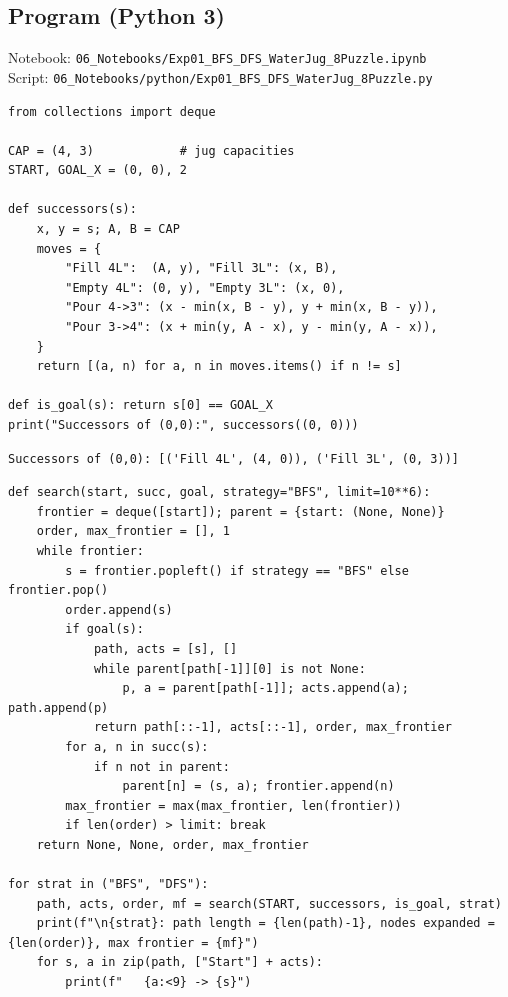 \documentclass[11pt]{article}
\begin{document}
\subsection*{Program (Python 3)}
{\small\color{slate}Notebook: \texttt{06\_Notebooks/Exp01\_BFS\_DFS\_WaterJug\_8Puzzle.ipynb}\\ Script: \texttt{06\_Notebooks/python/Exp01\_BFS\_DFS\_WaterJug\_8Puzzle.py}}
\begin{lstlisting}[style=py]
from collections import deque

CAP = (4, 3)            # jug capacities
START, GOAL_X = (0, 0), 2

def successors(s):
    x, y = s; A, B = CAP
    moves = {
        "Fill 4L":  (A, y), "Fill 3L": (x, B),
        "Empty 4L": (0, y), "Empty 3L": (x, 0),
        "Pour 4->3": (x - min(x, B - y), y + min(x, B - y)),
        "Pour 3->4": (x + min(y, A - x), y - min(y, A - x)),
    }
    return [(a, n) for a, n in moves.items() if n != s]

def is_goal(s): return s[0] == GOAL_X
print("Successors of (0,0):", successors((0, 0)))
\end{lstlisting}
\begin{lstlisting}[style=out]
Successors of (0,0): [('Fill 4L', (4, 0)), ('Fill 3L', (0, 3))]
\end{lstlisting}
\begin{lstlisting}[style=py]
def search(start, succ, goal, strategy="BFS", limit=10**6):
    frontier = deque([start]); parent = {start: (None, None)}
    order, max_frontier = [], 1
    while frontier:
        s = frontier.popleft() if strategy == "BFS" else frontier.pop()
        order.append(s)
        if goal(s):
            path, acts = [s], []
            while parent[path[-1]][0] is not None:
                p, a = parent[path[-1]]; acts.append(a); path.append(p)
            return path[::-1], acts[::-1], order, max_frontier
        for a, n in succ(s):
            if n not in parent:
                parent[n] = (s, a); frontier.append(n)
        max_frontier = max(max_frontier, len(frontier))
        if len(order) > limit: break
    return None, None, order, max_frontier

for strat in ("BFS", "DFS"):
    path, acts, order, mf = search(START, successors, is_goal, strat)
    print(f"\n{strat}: path length = {len(path)-1}, nodes expanded = {len(order)}, max frontier = {mf}")
    for s, a in zip(path, ["Start"] + acts):
        print(f"   {a:<9} -> {s}")
\end{lstlisting}
\end{document}
